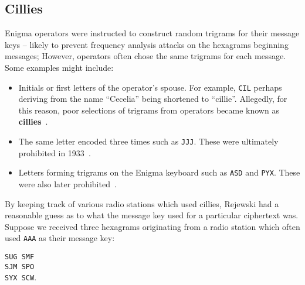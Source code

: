 \subsection{Cillies}\label{section_cillies}
Enigma operators were instructed to construct random trigrams for
their message keys -- likely to prevent frequency analysis attacks on
the hexagrams beginning messages; However, operators often chose the
same trigrams for each message. Some examples might include:
\begin{itemize}
  \item Initials or first letters of the operator's spouse. For
    example, \texttt{CIL} perhaps deriving from the name ``Cecelia''
    being shortened to ``cillie''. Allegedly, for this reason, poor
    selections of trigrams from operators became known as {\bf{cillies}}~\cite[p.~143]{BudianskyBattleOfWits2000}.
  \item The same letter encoded three times such as \texttt{JJJ}.
    These were ultimately prohibited in 1933~\cite[p.~241]{KozaczukEnigma1984}.
  \item Letters forming trigrams on the Enigma keyboard such as
    \texttt{ASD} and \texttt{PYX}. These were also later prohibited~\cite[p.~241]{KozaczukEnigma1984}.

\end{itemize}
By keeping track of various radio stations which used cillies,
Rejewski had a reasonable guess as to what the message key used for a
particular ciphertext was. Suppose we received three hexagrams
originating from a radio station which often used \texttt{AAA} as
their message key:
\begin{center}
  \texttt{SUG SMF}\\
  \texttt{SJM SPO}\\
  \texttt{SYX SCW}.
\end{center}


